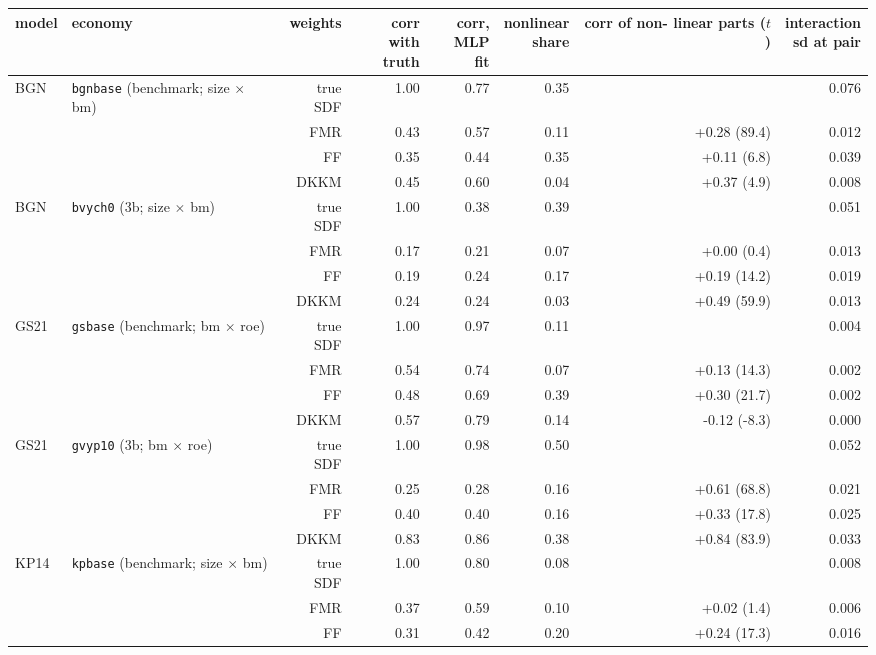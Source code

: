 \begin{table}[htbp]\centering\small
\begin{tabular}{llrrrrrr}
\toprule
model & economy & weights & \shortstack{corr with\\truth} & \shortstack{corr,\\MLP fit} & \shortstack{nonlinear\\share} & \shortstack{corr of non-\\linear parts ($t$)} & \shortstack{interaction\\sd at pair} \\
\midrule
BGN & \texttt{bgnbase} (benchmark; size $\times$ bm) & true SDF & 1.00 & 0.77 & 0.35 &  & 0.076 \\
 &  & FMR & 0.43 & 0.57 & 0.11 & +0.28 (89.4) & 0.012 \\
 &  & FF & 0.35 & 0.44 & 0.35 & +0.11 (6.8) & 0.039 \\
 &  & DKKM & 0.45 & 0.60 & 0.04 & +0.37 (4.9) & 0.008 \\
\midrule
BGN & \texttt{bvych0} (3b; size $\times$ bm) & true SDF & 1.00 & 0.38 & 0.39 &  & 0.051 \\
 &  & FMR & 0.17 & 0.21 & 0.07 & +0.00 (0.4) & 0.013 \\
 &  & FF & 0.19 & 0.24 & 0.17 & +0.19 (14.2) & 0.019 \\
 &  & DKKM & 0.24 & 0.24 & 0.03 & +0.49 (59.9) & 0.013 \\
\midrule
GS21 & \texttt{gsbase} (benchmark; bm $\times$ roe) & true SDF & 1.00 & 0.97 & 0.11 &  & 0.004 \\
 &  & FMR & 0.54 & 0.74 & 0.07 & +0.13 (14.3) & 0.002 \\
 &  & FF & 0.48 & 0.69 & 0.39 & +0.30 (21.7) & 0.002 \\
 &  & DKKM & 0.57 & 0.79 & 0.14 & -0.12 (-8.3) & 0.000 \\
\midrule
GS21 & \texttt{gvyp10} (3b; bm $\times$ roe) & true SDF & 1.00 & 0.98 & 0.50 &  & 0.052 \\
 &  & FMR & 0.25 & 0.28 & 0.16 & +0.61 (68.8) & 0.021 \\
 &  & FF & 0.40 & 0.40 & 0.16 & +0.33 (17.8) & 0.025 \\
 &  & DKKM & 0.83 & 0.86 & 0.38 & +0.84 (83.9) & 0.033 \\
\midrule
KP14 & \texttt{kpbase} (benchmark; size $\times$ bm) & true SDF & 1.00 & 0.80 & 0.08 &  & 0.008 \\
 &  & FMR & 0.37 & 0.59 & 0.10 & +0.02 (1.4) & 0.006 \\
 &  & FF & 0.31 & 0.42 & 0.20 & +0.24 (17.3) & 0.016 \\

\end{tabular}
\end{table}

